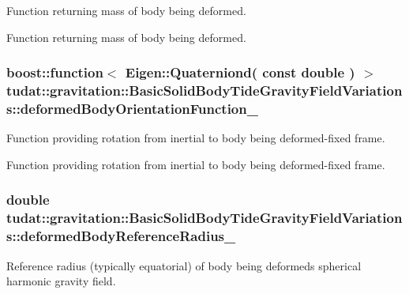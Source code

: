Function returning mass of body being deformed. 

Function returning mass of body being deformed. 
\subsubsection[{\texorpdfstring{deformed\+Body\+Orientation\+Function\+\_\+}{deformedBodyOrientationFunction_}}]{\setlength{\rightskip}{0pt plus 5cm}boost\+::function$<$ Eigen\+::\+Quaterniond( const double ) $>$ tudat\+::gravitation\+::\+Basic\+Solid\+Body\+Tide\+Gravity\+Field\+Variations\+::deformed\+Body\+Orientation\+Function\+\_\+\hspace{0.3cm}{\ttfamily [protected]}}\hypertarget{classtudat_1_1gravitation_1_1BasicSolidBodyTideGravityFieldVariations_a2ee3f417b4324455f45a353282759149}{}\label{classtudat_1_1gravitation_1_1BasicSolidBodyTideGravityFieldVariations_a2ee3f417b4324455f45a353282759149}


Function providing rotation from inertial to body being deformed-\/fixed frame. 

Function providing rotation from inertial to body being deformed-\/fixed frame. 
\subsubsection[{\texorpdfstring{deformed\+Body\+Reference\+Radius\+\_\+}{deformedBodyReferenceRadius_}}]{\setlength{\rightskip}{0pt plus 5cm}double tudat\+::gravitation\+::\+Basic\+Solid\+Body\+Tide\+Gravity\+Field\+Variations\+::deformed\+Body\+Reference\+Radius\+\_\+\hspace{0.3cm}{\ttfamily [protected]}}\hypertarget{classtudat_1_1gravitation_1_1BasicSolidBodyTideGravityFieldVariations_abe0acaf654a36869a9abd709a09607b0}{}\label{classtudat_1_1gravitation_1_1BasicSolidBodyTideGravityFieldVariations_abe0acaf654a36869a9abd709a09607b0}
Reference radius (typically equatorial) of body being deformed\textquotesingle{}s spherical harmonic gravity field.

